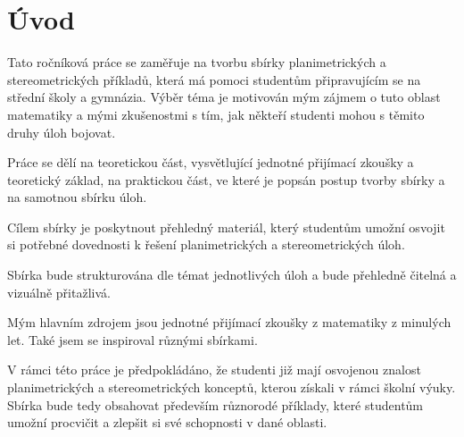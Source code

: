 \chapter*{Úvod}

Tato ročníková práce se zaměřuje na tvorbu sbírky planimetrických a stereometrických příkladů, která má pomoci studentům připravujícím se na střední školy a gymnázia. Výběr téma je motivován mým zájmem o tuto oblast matematiky a mými zkušenostmi s tím, jak někteří studenti mohou s těmito druhy úloh bojovat.

Práce se dělí na teoretickou část, vysvětlující jednotné přijímací zkoušky a teoretický základ, na praktickou část, ve které je popsán postup tvorby sbírky a na samotnou sbírku úloh.

Cílem sbírky je poskytnout přehledný materiál, který studentům umožní osvojit si potřebné dovednosti k řešení planimetrických a stereometrických úloh.

Sbírka bude strukturována dle témat jednotlivých úloh a bude přehledně čitelná a vizuálně přitažlivá.

Mým hlavním zdrojem jsou jednotné přijímací zkoušky z matematiky z minulých let. Také jsem se inspiroval různými sbírkami. 

V rámci této práce je předpokládáno, že studenti již mají osvojenou znalost planimetrických a stereometrických konceptů, kterou získali v rámci školní výuky. Sbírka bude tedy obsahovat především různorodé příklady, které studentům umožní procvičit a zlepšit si své schopnosti v dané oblasti.
